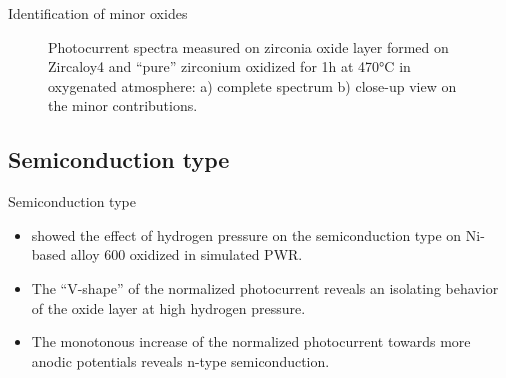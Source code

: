 \documentclass[10pt,compress]{beamer}
\begin{document}
\begin{frame}[allowframebreaks=1.0]{Identification of minor oxides}
\begin{figure}[h]
            \caption{Photocurrent spectra measured on zirconia oxide layer formed on 
            Zircaloy4 and “pure” zirconium oxidized for 1h at 470°C in oxygenated 
            atmosphere\citep{benaboud2007}: a) complete spectrum b) close-up view on the minor contributions.}
            \label{fig_benaboud_minor_oxides}
        \end{figure}
    \end{frame}

\subsection{Semiconduction type}
    \begin{frame}[allowframebreaks=1.0]{Semiconduction type}
        \begin{itemize}
            \item \citet{loucif2013} showed the effect of hydrogen pressure on 
                  the semiconduction type on Ni-based alloy 600 oxidized in simulated PWR. 
            \item The “V-shape” of the normalized photocurrent 
                  reveals an isolating behavior of the oxide layer at high hydrogen pressure. 
            \item The monotonous increase of the 
                  normalized photocurrent towards more anodic potentials reveals 
                  n-type semiconduction.
        \end{itemize}


\end{frame}
\end{document}

